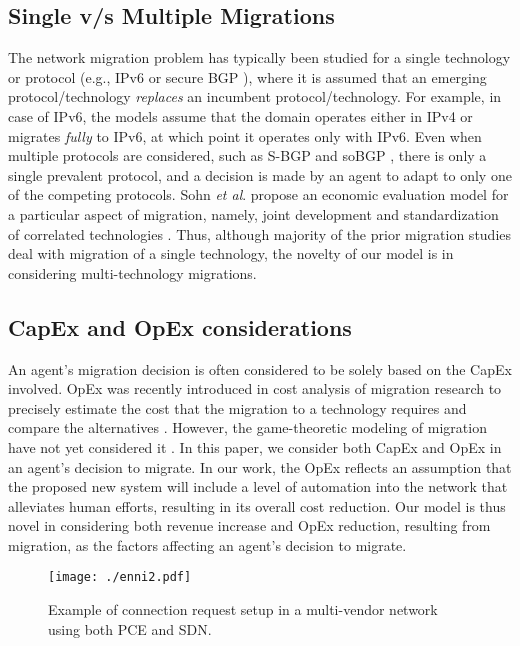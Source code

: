 \documentclass[smallextended]{svjour3}
\begin{document}
\subsection{Single v/s Multiple Migrations}
\par The network migration problem has typically been studied for a single
technology or protocol (e.g., IPv6 \cite{Joseph07, Trinh10} or secure BGP
\cite{Gill11, Chan06}), where it is assumed that an emerging protocol/technology
\emph{replaces} an incumbent protocol/technology. For example, in case of IPv6,
the models assume that the domain operates either in IPv4 or migrates \emph{fully} to IPv6,
at which point it operates only with IPv6. Even when multiple protocols are
considered, such as S-BGP and soBGP \cite{Chan06}, there is only a single
prevalent protocol, and a decision is made by an agent to adapt to only one of
the competing protocols. Sohn \emph{et al}. propose an economic
evaluation model for a particular aspect of migration, namely, joint development
and standardization of correlated technologies \cite{Sohn11}. Thus, although
majority of the prior migration studies deal with migration of a single technology, the novelty
of our model is in considering multi-technology migrations.

\subsection{CapEx and OpEx considerations}
\par An agent's migration decision is often considered to be solely based on the
CapEx involved. OpEx was recently introduced in cost analysis of migration
research to precisely estimate the cost that the migration to a technology
requires and compare the alternatives \cite{Verbrugge05}. However, the
game-theoretic modeling of migration have not yet considered it \cite{Jin08,
Sen10, Gill11, Chan06, Joseph07, Trinh10}. In this paper, we consider both CapEx
and OpEx in an agent's decision to migrate. In our work, the OpEx reflects an
assumption that the proposed new system will include a level of automation into
the network that alleviates human efforts, resulting in its overall cost
reduction. Our model is thus novel in considering both revenue increase and OpEx
reduction, resulting from migration, as the factors affecting an agent's
decision to migrate.

\begin{figure*}[thb] \centering
\texttt{[image: ./enni2.pdf]}
\caption{Example of connection request setup in a multi-vendor network using
both PCE and SDN.}
\label{figUNI}
\end{figure*}
\end{document}
